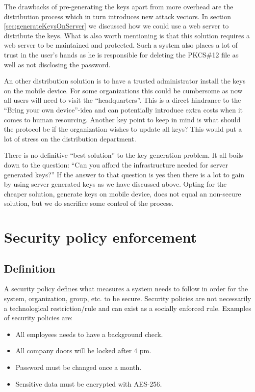The drawbacks of pre-generating the keys apart from more overhead are the distribution process which in turn introduces new attack vectors. In section \ref{sec:generateKeysOnServer} we discussed how we could use a web server to distribute the keys. What is also worth mentioning is that this solution requires a web server to be maintained and protected. Such a system also places a lot of trust in the user's hands as he is responsible for deleting the PKCS\#12 file as well as not disclosing the password.

An other distribution solution is to have a trusted administrator install the keys on the mobile device. For some organizations this could be cumbersome as now all users will need to visit the ``headquarters''. This is a direct hindrance to the ``Bring your own device''-idea and can potentially introduce extra costs when it comes to human resourcing. Another key point to keep in mind is what should the protocol be if the organization wishes to update all keys? This would put a lot of stress on the distribution department.

There is no definitive ``best solution'' to the key generation problem. It all boils down to the question: ``Can you afford the infrastructure needed for server generated keys?'' If the answer to that question is yes then there is a lot to gain by using server generated keys as we have discussed above. Opting for the cheaper solution, generate keys on mobile device, does not equal an non-secure solution, but we do sacrifice some control of the process.


\section{Security policy enforcement}
\label{sec:policies}

\subsection{Definition}
A security policy defines what measures a system needs to follow in order for the system, organization, group, etc. to be secure. Security policies are not necessarily a technological restriction/rule and can exist as a socially enforced rule. Examples of security policies are:
\begin{itemize}
  \item All employees needs to have a background check.
  \item All company doors will be locked after 4 pm.
  \item Password must be changed once a month.
  \item Sensitive data must be encrypted with AES-256.
\end{itemize}

